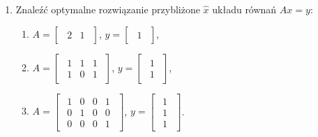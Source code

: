 \documentclass{article}
\begin{document}
\begin{enumerate}
    \item Znaleźć optymalne rozwiązanie przybliżone $\hat{x}$ układu równań $Ax = y$:
        \begin{enumerate}
            \item $A = \begin{bmatrix}\begin{array}{rr} 2 & 1 \end{array}\end{bmatrix}$, $y = \begin{bmatrix}\begin{array}{r} 1 \end{array}\end{bmatrix}$,
            \item $A = \begin{bmatrix}\begin{array}{rrr} 1 & 1 & 1\\ 1 & 0 & 1 \end{array}\end{bmatrix}$, $y = \begin{bmatrix}\begin{array}{r} 1 \\ 1 \end{array}\end{bmatrix}$,
            \item $A = \begin{bmatrix}\begin{array}{rrrr} 1 & 0 & 0 & 1\\ 0 & 1 & 0 & 0\\ 0 & 0 & 0 & 1 \end{array}\end{bmatrix}$, $y = \begin{bmatrix}\begin{array}{r} 1\\ 1\\ 1 \end{array}\end{bmatrix}$.
        \end{enumerate}
\end{enumerate}
\end{document}
